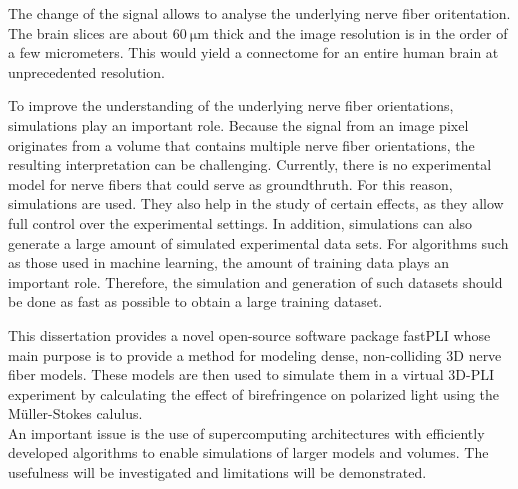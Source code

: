 The change of the signal allows to analyse the underlying nerve fiber oritentation.
The brain slices are about $\SI{60}{\micro\meter}$ thick and the image resolution is in the order of a few micrometers.
This would yield a connectome for an entire human brain at unprecedented resolution. \cite{Axer2011a, Axer2011, Axer2016}
\par
% 
To improve the understanding of the underlying nerve fiber orientations, simulations play an important role.
Because the signal from an image pixel originates from a volume that contains multiple nerve fiber orientations, the resulting interpretation can be challenging.
Currently, there is no experimental model for nerve fibers that could serve as groundthruth.
For this reason, simulations are used.
They also help in the study of certain effects, as they allow full control over the experimental settings.
In addition, simulations can also generate a large amount of simulated experimental data sets.
For algorithms such as those used in machine learning, the amount of training data plays an important role.
Therefore, the simulation and generation of such datasets should be done as fast as possible to obtain a large training dataset.
\cite{Ginsburger2018, ginsburgerDis2019, Callaghan2019, Menzel2020}
\par
%
This dissertation provides a novel open-source software package \ac{fastPLI} whose main purpose is to provide a method for modeling dense, non-colliding 3D nerve fiber models.
These models are then used to simulate them in a virtual \ac{3D-PLI} experiment by calculating the effect of birefringence on polarized light using the M\"{u}ller-Stokes calulus. \cite{Matuschke2019, Matuschke2021, Reuter2019}\\
An important issue is the use of supercomputing architectures with efficiently developed algorithms to enable simulations of larger models and volumes.
The usefulness will be investigated and limitations will be demonstrated.